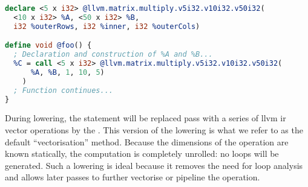 \documentclass[\main/thesis.tex]{subfiles}
\begin{document}
\begin{lstlisting}[caption={[Declaration and Use of \code{llvm.matrix.multiply.*}]An example declaration and usage of the \code{llvm.matrix.multiply.*} intrinsic.},
      label=lst:matMulIntr,language=llvm,basicstyle=\footnotesize,float]
declare <5 x i32> @llvm.matrix.multiply.v5i32.v10i32.v50i32(
  <10 x i32> %A, <50 x i32> %B,
  i32 %outerRows, i32 %inner, i32 %outerCols)

define void @foo() {
  ; Declaration and construction of %A and %B...
  %C = call <5 x i32> @llvm.matrix.multiply.v5i32.v10i32.v50i32(
      %A, %B, 1, 10, 5)
    )
  ; Function continues...
}
\end{lstlisting}

During lowering, the  statement will be replaced pass with a series of \gls{llvm} \gls{ir} vector operations by the .
This version of the lowering is what we refer to as the default ``vectorisation'' method.
Because the dimensions of the operation are known statically, the computation is completely unrolled: no loops will be generated.
Such a lowering is ideal because it removes the need for loop analysis and allows later passes to further vectorise or pipeline the operation.
\end{document}
